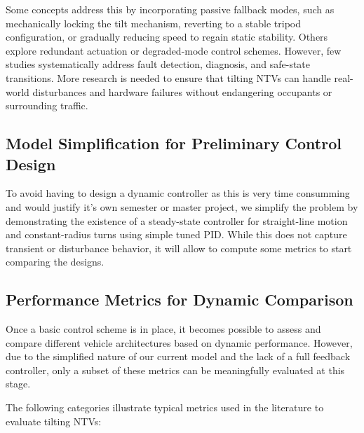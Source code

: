 Some concepts address this by incorporating passive fallback modes, such as mechanically locking the tilt mechanism, reverting to a stable tripod configuration, or gradually reducing speed to regain static stability. Others explore redundant actuation or degraded-mode control schemes. However, few studies systematically address fault detection, diagnosis, and safe-state transitions. More research is needed to ensure that tilting NTVs can handle real-world disturbances and hardware failures without endangering occupants or surrounding traffic.

\subsection*{Model Simplification for Preliminary Control Design}

To avoid having to design a dynamic controller as this is very time consumming and would justify it's own semester or master project, we simplify the problem by demonstrating the existence of a steady-state controller for straight-line motion and constant-radius turns using simple tuned PID. While this does not capture transient or disturbance behavior, it will allow to compute some metrics to start comparing the designs.

\newpage 

\subsection*{Performance Metrics for Dynamic Comparison}

Once a basic control scheme is in place, it becomes possible to assess and compare different vehicle architectures based on dynamic performance. However, due to the simplified nature of our current model and the lack of a full feedback controller, only a subset of these metrics can be meaningfully evaluated at this stage.

The following categories illustrate typical metrics used in the literature to evaluate tilting NTVs:

